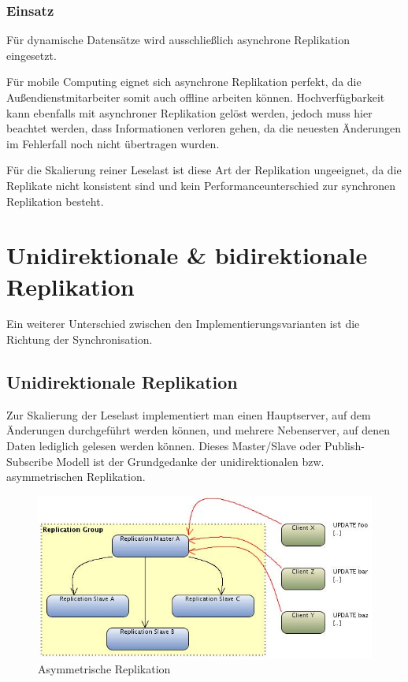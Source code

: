 \subsubsection{Einsatz}

Für dynamische Datensätze wird ausschließlich asynchrone Replikation eingesetzt.

Für mobile Computing eignet sich asynchrone Replikation perfekt, da die Außendienstmitarbeiter somit auch offline arbeiten können. Hochverfügbarkeit kann ebenfalls mit asynchroner Replikation gelöst werden, jedoch muss hier beachtet werden, dass Informationen verloren gehen, da die neuesten Änderungen im Fehlerfall noch nicht übertragen wurden.

Für die Skalierung reiner Leselast ist diese Art der Replikation ungeeignet, da die Replikate nicht konsistent sind und kein Performanceunterschied zur synchronen Replikation besteht.

\section{Unidirektionale \& bidirektionale Replikation}

Ein weiterer Unterschied zwischen den Implementierungsvarianten ist die Richtung der Synchronisation. 

\subsection{Unidirektionale Replikation}

Zur Skalierung der Leselast implementiert man einen Hauptserver, auf dem Änderungen durchgeführt werden können, und mehrere Nebenserver, auf denen Daten lediglich gelesen werden können. Dieses Master/Slave oder Publish-Subscribe Modell ist der Grundgedanke der unidirektionalen bzw. asymmetrischen Replikation.

\begin{figure}[!h]
	\begin{center}
		\includegraphics[width=1\linewidth]{images/unidirektional.jpg}
		\caption{Asymmetrische Replikation \cite{leipzig}}
		\label{unidirektional}
	\end{center}
\end{figure}

